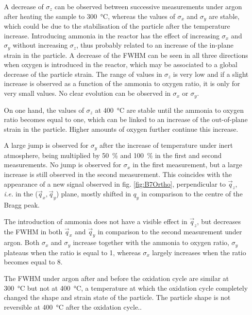 A decrease of $\sigma_z$ can be observed between successive measurements under argon after heating the sample to \qty{300}{\degreeCelsius}, whereas the values of $\sigma_x$ and $\sigma_y$ are stable, which could be due to the stabilisation of the particle after the temperature increase.
Introducing ammonia in the reactor has the effect of increasing $\sigma_x$ and $\sigma_y$ without increasing $\sigma_z$, thus probably related to an increase of the in-plane strain in the particle.
A decrease of the FWHM can be seen in all three directions when oxygen is introduced in the reactor, which may be associated to a global decrease of the particle strain.
The range of values in $\sigma_z$ is very low and if a slight increase is observed as a function of the ammonia to oxygen ratio, it is only for very small values.
No clear evolution can be observed in $\sigma_x$ or $\sigma_y$.

On one hand, the values of $\sigma_z$ at \qty{400}{\degreeCelsius} are stable until the ammonia to oxygen ratio becomes equal to one, which can be linked to an increase of the out-of-plane strain in the particle.
Higher amounts of oxygen further continue this increase.

A large jump is observed for $\sigma_y$ after the increase of temperature under inert atmosphere, being multiplied by \qty{50}{\percent} and \qty{100}{\percent} in the first and second measurements.
No jump is observed for $\sigma_x$ in the first measurement, but a large increase is still observed in the second measurement.
This coincides with the appearance of a new signal observed in fig. \ref{fig:B7Ortho}, perpendicular to $\vec{q}_z$, \textit{i.e.} in the ($\vec{q}_x, \vec{q}_y$) plane, mostly shifted in $q_y$ in comparison to the centre of the Bragg peak.

The introduction of ammonia does not have a visible effect in $\vec{q}_z$, but decreases the FWHM in both $\vec{q}_x$ and $\vec{q}_y$ in comparison to the second measurement under argon.
Both $\sigma_x$ and $\sigma_y$ increase together with the ammonia to oxygen ratio, $\sigma_y$ plateaus when the ratio is equal to 1, whereas $\sigma_x$ largely increases when the ratio becomes equal to 8.

The FWHM under argon after and before the oxidation cycle are similar at \qty{300}{\degreeCelsius} but not at \qty{400}{\degreeCelsius}, a temperature at which the oxidation cycle completely changed the shape and strain state of the particle.
The particle shape is not reversible at \qty{400}{\degreeCelsius} after the oxidation cycle..


